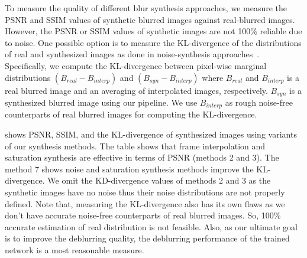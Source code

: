 To measure the quality of different blur synthesis approaches, we measure the PSNR and SSIM values of synthetic blurred images against real-blurred images.
However, the PSNR or SSIM values of synthetic images are not 100\% reliable due to noise.
One possible option is to measure the KL-divergence of the distributions of real and synthesized images as done in noise-synthesis approaches~\cite{Abdelhamed_2019_ICCV, Chang_2020_ECCV, Jang_2021_ICCV}.
Specifically, we compute the KL-divergence between pixel-wise marginal distributions $(B_{real} - B_{interp})$ and $(B_{syn} - B_{interp})$ where $B_{real}$ and $B_{interp}$ is a real blurred image and an averaging of interpolated images, respectively. $B_{syn}$ is a synthesized blurred image using our pipeline.
We use $B_{interp}$ as rough noise-free counterparts of real blurred images for computing the KL-divergence.

 shows PSNR, SSIM, and the KL-divergence of synthesized images using variants of our synthesis methods. 
The table shows that frame interpolation and saturation synthesis are effective in terms of PSNR (methods 2 and 3). The method 7 shows noise and saturation synthesis methods improve the KL-divergence. We omit the KD-divergence values of methods 2 and 3 as the synthetic images have no noise thus their noise distributions are not properly defined.
Note that, measuring the KL-divergence also has its own flaws as we don't have accurate noise-free counterparts of real blurred images. So, 100\% accurate estimation of real distribution is not feasible.
Also, as our ultimate goal is to improve the deblurring quality, the deblurring performance of the trained network is a most reasonable measure. 

